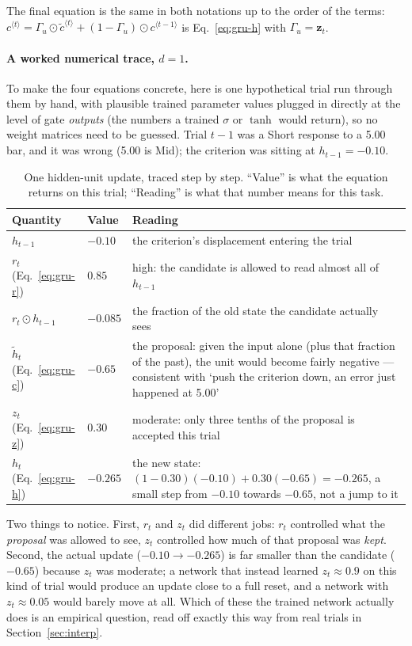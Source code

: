 \documentclass[11pt,a4paper]{article}
\newcommand{\vect}[1]{\bm{#1}}
\begin{document}
The final equation is the same in both notations up to the order of the terms:
$c^{\langle t\rangle} = \Gamma_u \odot \tilde{c}^{\langle t\rangle} + (1 - \Gamma_u) \odot c^{\langle t-1\rangle}$
is Eq.~\eqref{eq:gru-h} with $\Gamma_u = \vect{z}_t$.

\paragraph{A worked numerical trace, $d = 1$.} To make the four equations concrete,
here is one hypothetical trial run through them by hand, with plausible trained
parameter values plugged in directly at the level of gate \emph{outputs} (the numbers a
trained $\sigma$ or $\tanh$ would return), so no weight matrices need to be guessed.
Trial $t-1$ was a Short response to a 5.00 bar, and it was wrong (5.00 is Mid); the
criterion was sitting at $h_{t-1} = -0.10$.

\begin{table}[H]
  \centering\small
  \caption{One hidden-unit update, traced step by step. ``Value'' is what the equation
  returns on this trial; ``Reading'' is what that number means for this task.}
  \begin{tabular}{p{2.6cm}p{1.6cm}p{9.3cm}}
    \toprule
    Quantity & Value & Reading \\
    \midrule
    $h_{t-1}$ & $-0.10$ & the criterion's displacement entering the trial \\
    $r_t$ (Eq.~\ref{eq:gru-r}) & $0.85$ & high: the candidate is allowed to read almost all of $h_{t-1}$ \\
    $r_t \odot h_{t-1}$ & $-0.085$ & the fraction of the old state the candidate actually sees \\
    $\tilde h_t$ (Eq.~\ref{eq:gru-c}) & $-0.65$ & the proposal: given the input alone (plus that fraction of the past), the unit would become fairly negative — consistent with `push the criterion down, an error just happened at 5.00' \\
    $z_t$ (Eq.~\ref{eq:gru-z}) & $0.30$ & moderate: only three tenths of the proposal is accepted this trial \\
    $h_t$ (Eq.~\ref{eq:gru-h}) & $-0.265$ & the new state: $(1{-}0.30)(-0.10) + 0.30(-0.65) = -0.265$, a small step from $-0.10$ towards $-0.65$, not a jump to it \\
    \bottomrule
  \end{tabular}
\end{table}

Two things to notice. First, $r_t$ and $z_t$ did different jobs: $r_t$ controlled what the
\emph{proposal} was allowed to see, $z_t$ controlled how much of that proposal was
\emph{kept}. Second, the actual update ($-0.10 \to -0.265$) is far smaller than the
candidate ($-0.65$) because $z_t$ was moderate; a network that instead learned $z_t
\approx 0.9$ on this kind of trial would produce an update close to a full reset, and a
network with $z_t \approx 0.05$ would barely move at all. Which of these the trained
network actually does is an empirical question, read off exactly this way from real
trials in Section~\ref{sec:interp}.
\end{document}
